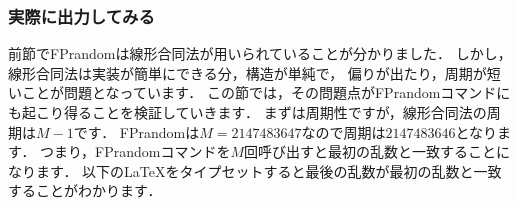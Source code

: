 \subsubsection{実際に出力してみる}
前節でFPrandomは線形合同法が用いられていることが分かりました．
しかし，線形合同法は実装が簡単にできる分，構造が単純で，
偏りが出たり，周期が短いことが問題となっています．
この節では，その問題点がFPrandomコマンドにも起こり得ることを検証していきます．
まずは周期性ですが，線形合同法の周期は$M-1$です．
FPrandomは$M=2147483647$なので周期は$2147483646$となります．
つまり，FPrandomコマンドを$M$回呼び出すと最初の乱数と一致することになります．
以下の\LaTeX をタイプセットすると最後の乱数が最初の乱数と一致することがわかります．
